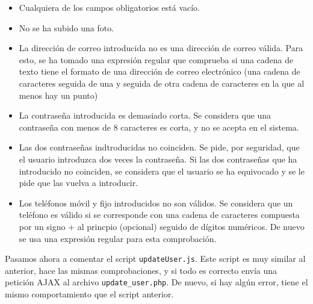\documentclass[11pt]{article}
\theoremstyle{plain}
\theoremstyle{definition}
\begin{document}
\begin{itemize}
\item Cualquiera de los campos obligatorios está vacío.
\item No se ha subido una foto.
\item La dirección de correo introducida no es una dirección de correo
  válida. Para esto, se ha tomado una expresión regular que comprueba
  si una cadena de texto tiene el formato de una dirección de correo
  electrónico (una cadena de caracteres seguida de una \@ y seguida de
  otra cadena de caracteres en la que al menos hay un punto)
\item La contraseña introducida es demasiado corta. Se considera que
  una contraseña con menos de 8 caracteres es corta, y no se acepta en
  el sistema.
\item Las dos contraseñas indtroducidas no coinciden. Se pide, por
  seguridad, que el usuario introduzca dos veces la contraseña. Si las
  dos contraseñas que ha introducido no coinciden, se considera que el
  usuario se ha equivocado y se le pide que las vuelva a introducir.
\item Los teléfonos móvil y fijo introducidos no son válidos. Se
  considera que un teléfono es válido si se corresponde con una cadena
  de caracteres compuesta por un signo + al princpio (opcional)
  seguido de dígitos numéricos. De nuevo se usa una expresión regular
  para esta comprobación.
\end{itemize}

Pasamos ahora a comentar el script \texttt{updateUser.js}. Este script
es muy similar al anterior, hace las mismas comprobaciones, y si todo
es correcto envía una petición AJAX al archivo
\texttt{update\_user.php}.  De nuevo, si hay algún error, tiene el
mismo comportamiento que el script
anterior.\\
\end{document}
